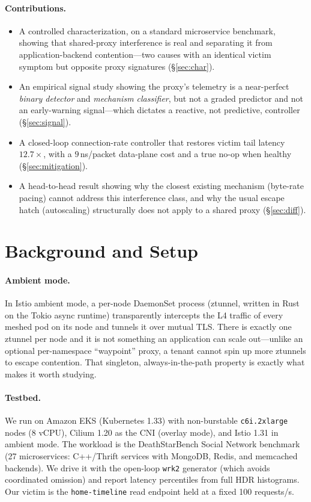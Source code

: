 \documentclass[10pt,twocolumn]{article}
\begin{document}
\paragraph{Contributions.}
\begin{itemize}
\item A controlled characterization, on a standard microservice benchmark, showing that
shared-proxy interference is real and separating it from application-backend
contention---two causes with an identical victim symptom but opposite proxy signatures
(\S\ref{sec:char}).
\item An empirical signal study showing the proxy's telemetry is a near-perfect
\emph{binary detector} and \emph{mechanism classifier}, but not a graded predictor and
not an early-warning signal---which dictates a reactive, not predictive, controller
(\S\ref{sec:signal}).
\item A closed-loop connection-rate controller that restores victim tail latency
$12.7\times$, with a $9\,$ns/packet data-plane cost and a true no-op when healthy
(\S\ref{sec:mitigation}).
\item A head-to-head result showing why the closest existing mechanism (byte-rate
pacing) cannot address this interference class, and why the usual escape hatch
(autoscaling) structurally does not apply to a shared proxy (\S\ref{sec:diff}).
\end{itemize}

\section{Background and Setup}
\label{sec:setup}
\paragraph{Ambient mode.} In Istio ambient mode, a per-node DaemonSet
process (ztunnel, written in Rust on the Tokio async runtime) transparently intercepts
the L4 traffic of every meshed pod on its node and tunnels it over mutual TLS. There is
exactly one ztunnel per node and it is not something an application can scale
out---unlike an optional per-namespace ``waypoint'' proxy, a tenant cannot spin up more
ztunnels to escape contention. That singleton, always-in-the-path property is exactly
what makes it worth studying.

\paragraph{Testbed.} We run on Amazon EKS (Kubernetes 1.33) with non-burstable
\texttt{c6i.2xlarge} nodes (8 vCPU), Cilium 1.20 as the CNI (overlay mode), and Istio
1.31 in ambient mode. The workload is the DeathStarBench Social Network benchmark (27
microservices: C++/Thrift services with MongoDB, Redis, and memcached backends). We
drive it with the open-loop \texttt{wrk2} generator (which avoids coordinated omission)
and report latency percentiles from full HDR histograms. Our victim is the
\texttt{home-timeline} read endpoint held at a fixed 100 requests/s.
\end{document}

